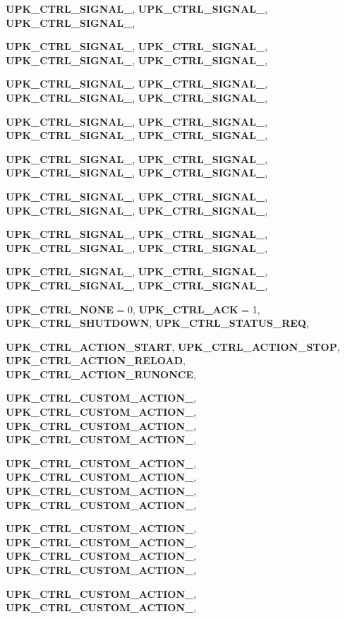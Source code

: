 \begin{DoxyCompactItemize}
{\bf UPK\_\-CTRL\_\-SIGNAL\_}, 
{\bf UPK\_\-CTRL\_\-SIGNAL\_}, 
{\bf UPK\_\-CTRL\_\-SIGNAL\_}, 
\par
{\bf UPK\_\-CTRL\_\-SIGNAL\_}, 
{\bf UPK\_\-CTRL\_\-SIGNAL\_}, 
{\bf UPK\_\-CTRL\_\-SIGNAL\_}, 
{\bf UPK\_\-CTRL\_\-SIGNAL\_}, 
\par
{\bf UPK\_\-CTRL\_\-SIGNAL\_}, 
{\bf UPK\_\-CTRL\_\-SIGNAL\_}, 
{\bf UPK\_\-CTRL\_\-SIGNAL\_}, 
{\bf UPK\_\-CTRL\_\-SIGNAL\_}, 
\par
{\bf UPK\_\-CTRL\_\-SIGNAL\_}, 
{\bf UPK\_\-CTRL\_\-SIGNAL\_}, 
{\bf UPK\_\-CTRL\_\-SIGNAL\_}, 
{\bf UPK\_\-CTRL\_\-SIGNAL\_}, 
\par
{\bf UPK\_\-CTRL\_\-SIGNAL\_}, 
{\bf UPK\_\-CTRL\_\-SIGNAL\_}, 
{\bf UPK\_\-CTRL\_\-SIGNAL\_}, 
{\bf UPK\_\-CTRL\_\-SIGNAL\_}, 
\par
{\bf UPK\_\-CTRL\_\-SIGNAL\_}, 
{\bf UPK\_\-CTRL\_\-SIGNAL\_}, 
{\bf UPK\_\-CTRL\_\-SIGNAL\_}, 
{\bf UPK\_\-CTRL\_\-SIGNAL\_}, 
\par
{\bf UPK\_\-CTRL\_\-SIGNAL\_}, 
{\bf UPK\_\-CTRL\_\-SIGNAL\_}, 
{\bf UPK\_\-CTRL\_\-SIGNAL\_}, 
{\bf UPK\_\-CTRL\_\-SIGNAL\_}, 
\par
{\bf UPK\_\-CTRL\_\-SIGNAL\_}, 
{\bf UPK\_\-CTRL\_\-SIGNAL\_}, 
{\bf UPK\_\-CTRL\_\-SIGNAL\_}, 
{\bf UPK\_\-CTRL\_\-SIGNAL\_}, 
\par
{\bf UPK\_\-CTRL\_\-NONE} =  0, 
{\bf UPK\_\-CTRL\_\-ACK} =  1, 
{\bf UPK\_\-CTRL\_\-SHUTDOWN}, 
{\bf UPK\_\-CTRL\_\-STATUS\_\-REQ}, 
\par
{\bf UPK\_\-CTRL\_\-ACTION\_\-START}, 
{\bf UPK\_\-CTRL\_\-ACTION\_\-STOP}, 
{\bf UPK\_\-CTRL\_\-ACTION\_\-RELOAD}, 
{\bf UPK\_\-CTRL\_\-ACTION\_\-RUNONCE}, 
\par
{\bf UPK\_\-CTRL\_\-CUSTOM\_\-ACTION\_}, 
{\bf UPK\_\-CTRL\_\-CUSTOM\_\-ACTION\_}, 
{\bf UPK\_\-CTRL\_\-CUSTOM\_\-ACTION\_}, 
{\bf UPK\_\-CTRL\_\-CUSTOM\_\-ACTION\_}, 
\par
{\bf UPK\_\-CTRL\_\-CUSTOM\_\-ACTION\_}, 
{\bf UPK\_\-CTRL\_\-CUSTOM\_\-ACTION\_}, 
{\bf UPK\_\-CTRL\_\-CUSTOM\_\-ACTION\_}, 
{\bf UPK\_\-CTRL\_\-CUSTOM\_\-ACTION\_}, 
\par
{\bf UPK\_\-CTRL\_\-CUSTOM\_\-ACTION\_}, 
{\bf UPK\_\-CTRL\_\-CUSTOM\_\-ACTION\_}, 
{\bf UPK\_\-CTRL\_\-CUSTOM\_\-ACTION\_}, 
{\bf UPK\_\-CTRL\_\-CUSTOM\_\-ACTION\_}, 
\par
{\bf UPK\_\-CTRL\_\-CUSTOM\_\-ACTION\_}, 
{\bf UPK\_\-CTRL\_\-CUSTOM\_\-ACTION\_}, 

\end{DoxyCompactItemize}
